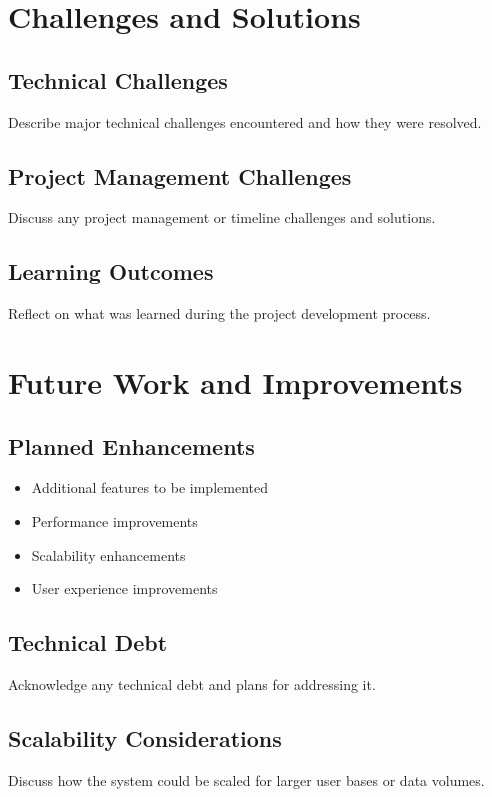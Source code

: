 \documentclass[12pt,a4paper]{article}
\begin{document}
\section{Challenges and Solutions}
\label{sec:challenges}

\subsection{Technical Challenges}
Describe major technical challenges encountered and how they were resolved.

\subsection{Project Management Challenges}
Discuss any project management or timeline challenges and solutions.

\subsection{Learning Outcomes}
Reflect on what was learned during the project development process.

\section{Future Work and Improvements}
\label{sec:future-work}

\subsection{Planned Enhancements}
\begin{itemize}
    \item Additional features to be implemented
    \item Performance improvements
    \item Scalability enhancements
    \item User experience improvements
\end{itemize}

\subsection{Technical Debt}
Acknowledge any technical debt and plans for addressing it.

\subsection{Scalability Considerations}
Discuss how the system could be scaled for larger user bases or data volumes.
\end{document}
